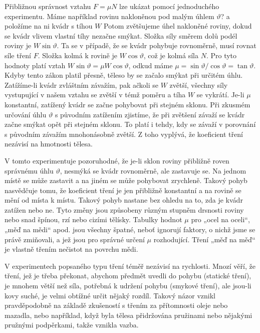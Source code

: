     Přibližnou správnost vztahu \(F = \mu N\) lze ukázat pomocí jednoduchého experimentu. Máme 
    například rovinu nakloněnou pod malým úhlem \(\vartheta\)? a položíme na ni kvádr s tíhou \(W\) 
    Potom zvětšujeme úhel nakloněné roviny, dokud se kvádr vlivem vlastní tíhy nezačne smýkat. 
    Složka síly směrem dolů podél roviny je \(W\sin\vartheta\). Ta se v případě, že se kvádr 
    pohybuje rovnoměrně, musí rovnat síle tření \(F\). Složka kolmá k rovině je \(W\cos\vartheta\), 
    což je kolmá síla \(N\). Pro tyto hodnoty platí vztah \(W\sin\vartheta = \mu W\cos\vartheta\), 
    odkud máme \(\mu = \sin\vartheta/\cos\vartheta = \tan\vartheta\). Kdyby tento zákon platil 
    přesně, těleso by se začalo smýkat při určitém úhlu. Zatížíme-li kvádr zvláštním závažím, pak 
    ačkoli se \(W\) zvětší, všechny síly vystupující v našem vztahu se zvětší v témž poměru a tíha 
    \(W\) se vykrátí. Je-li \(\mu\) konstantní, zatížený kvádr se začne pohybovat při stejném 
    sklonu. Při zkusmém určování úhlu \(\vartheta\) s původním zatížením zjistíme, že při zvětšení 
    závaží se kvádr začne smýkat opět při stejném sklonu. To platí i tehdy, kdy se závaží v 
    porovnání s původním závažím mnohonásobně zvětší. Z toho vyplývá, že koeficient tření nezávisí 
    na hmotnosti tělesa.
    
    V tomto experimentuje pozoruhodné, že je-li sklon roviny přibližně roven správnému úhlu 
    \(\vartheta\), nesmýká se kvádr rovnoměrně, ale zastavuje se. Na jednom místě se může zastavit 
    a na jiném se může pohybovat zrychleně. Takový pohyb nasvědčuje tomu, že koeficient tření je 
    jen přibližně konstantní a na rovině se mění od místa k místu. Takový pohyb nastane bez ohledu 
    na to, zda je kvádr zatížen nebo ne. Tyto změny jsou způsobeny různým stupněm drsnosti roviny 
    nebo snad špínou, rzí nebo cizími tělísky. Tabulky hodnot \(\mu\) pro „ocel na oceli“, „měď na 
    mědi“ apod. jsou všechny špatné, neboť ignorují faktory, o nichž jsme se právě zmiňovali, a jež 
    jsou pro správné určení \(\mu\) rozhodující. Tření „měď na měď“ je vlastně třením nečistot na 
    povrchu mědi.
    
    V experimentech popsaného typu tření téměř nezávisí na rychlosti. Mnozí věří, že tření, jež je 
    třeba překonat, abychom předmět uvedli do pohybu (statické tření), je mnohem větší než síla, 
    potřebná k udržení pohybu (smykové tření), ale jsou-li kovy suché, je velmi obtížné určit 
    nějaký rozdíl. Takový názor vznikl pravděpodobně na základě zkušeností s třením za přítomnosti 
    oleje nebo mazadla, nebo například, když byla tělesa přidržována pružinami nebo nějakými 
    pružnými podpěrkami, takže vznikla vazba.
    
